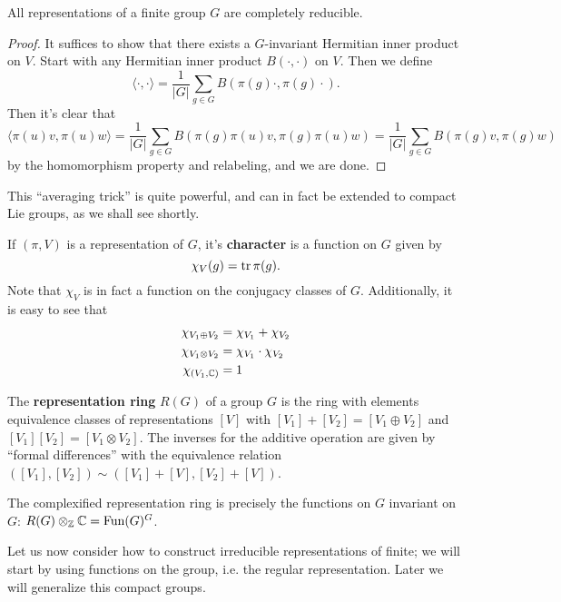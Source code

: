 \documentclass{../mathnotes}
\begin{document}
\begin{cor}
    All representations of a finite group $G$ are completely reducible.
\end{cor}
\begin{proof}
    It suffices to show that there exists a $G$-invariant Hermitian inner product on $V$. Start with any Hermitian inner product $B(\cdot,\cdot)$ on $V$. 
    Then we define
    \[\langle\cdot,\cdot\rangle=\frac{1}{|G|}\sum_{g\in G}B(\pi(g)\cdot,\pi(g)\cdot).\]
    Then it's clear that 
    \[\langle\pi(u)v,\pi(u)w\rangle=\frac{1}{|G|}\sum_{g\in G}B(\pi(g)\pi(u)v,\pi(g)\pi(u)w)=\frac{1}{|G|}\sum_{g\in G}B(\pi(g)v,\pi(g)w)\]
    by the homomorphism property and relabeling, and we are done.
\end{proof}

This ``averaging trick'' is quite powerful, and can in fact be extended to compact Lie groups, as we shall see shortly.

\begin{defn}
    If $(\pi,V)$ is a representation of $G$, it's \textbf{character} is a function on $G$ given by
    \[\chi_V(g)=\operatorname{tr} \pi(g).\]
    Note that $\chi_V$ is in fact a function on the conjugacy classes of $G$. Additionally, it is easy to see that
    \begin{align*}
        \chi_{V_1\oplus V_2}&=\chi_{V_1}+\chi_{V_2}\\
        \chi_{V_1\otimes V_2}&=\chi_{V_1}\cdot\chi_{V_2}\\
        \chi_{(V_1,\mathbb{C})}&=1
    \end{align*}
\end{defn}

\begin{defn}
    The \textbf{representation ring} $R(G)$ of a group $G$ is the ring with elements equivalence classes of representations $[V]$
    with $[V_1]+[V_2]=[V_1\oplus V_2]$ and $[V_1][V_2]=[V_1\otimes V_2]$. The inverses for the additive operation are given by ``formal
    differences'' with the equivalence relation $([V_1],[V_2])\sim([V_1]+[V],[V_2]+[V])$.
\end{defn}

\begin{lem}
    The complexified representation ring is precisely the functions on $G$ invariant on $G$: $R(G)\otimes_{\mathbb{Z}}\mathbb{C}=\text{Fun}(G)^G$.
\end{lem}

Let us now consider how to construct irreducible representations of finite; we will start by using functions on the group, i.e. the regular representation.
Later we will generalize this compact groups.
\end{document}
